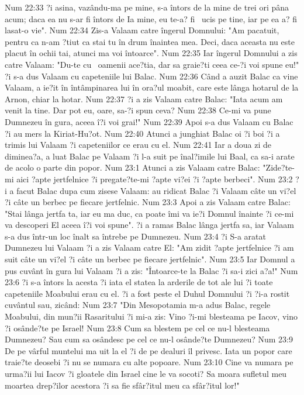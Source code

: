 Num 22:33  ?i asina, vazându-ma pe mine, s-a întors de la mine de trei ori pâna acum; daca ea nu s-ar fi întors de Ia mine, eu te-a? fi  ucis pe tine, iar pe ea a? fi lasat-o vie".
Num 22:34  Zis-a Valaam catre îngerul Domnului: "Am pacatuit, pentru ca n-am ?tiut ca stai tu în drum înaintea mea. Deci, daca aceasta nu este placut în ochii tai, atunci ma voi întoarce".
Num 22:35  Iar îngerul Domnului a zis catre Valaam: "Du-te cu  oamenii ace?tia, dar sa graie?ti ceea ce-?i voi spune eu!" ?i s-a dus Valaam cu capeteniile lui Balac.
Num 22:36  Când a auzit Balac ca vine Valaam, a ie?it în întâmpinarea lui în ora?ul moabit, care este lânga hotarul de la Arnon, chiar la hotar.
Num 22:37  ?i a zis Valaam catre Balac: "Iata acum am venit la tine. Dar pot eu, oare, sa-?i spun ceva?
Num 22:38  Ce-mi va pune Dumnezeu în gura, aceea î?i voi grai!"
Num 22:39  Apoi s-a dus Valaam cu Balac ?i au mers la Kiriat-Hu?ot.
Num 22:40  Atunci a junghiat Balac oi ?i boi ?i a trimis lui Valaam ?i capeteniilor ce erau cu el.
Num 22:41  Iar a doua zi de diminea?a, a luat Balac pe Valaam ?i l-a suit pe înal?imile lui Baal, ca sa-i arate de acolo o parte din popor.
Num 23:1  Atunci a zis Valaam catre Balac: "Zide?te-mi aici ?apte jertfelnice ?i pregate?te-mi ?apte vi?ei ?i ?apte berbeci".
Num 23:2  ?i a facut Balac dupa cum zisese Valaam: au ridicat Balac ?i Valaam câte un vi?el ?i câte un berbec pe fiecare jertfelnic.
Num 23:3  Apoi a zis Valaam catre Balac: "Stai lânga jertfa ta, iar eu ma duc, ca poate îmi va ie?i Domnul înainte ?i ce-mi va descoperi El aceea î?i voi spune". ?i a ramas Balac lânga jertfa sa, iar Valaam s-a dus într-un loc înalt sa întrebe pe Dumnezeu.
Num 23:4  ?i S-a aratat Dumnezeu lui Valaam ?i a zis Valaam catre El: "Am zidit ?apte jertfelnice ?i am suit câte un vi?el ?i câte un berbec pe fiecare jertfelnic".
Num 23:5  Iar Domnul a pus cuvânt în gura lui Valaam ?i a zis: "Întoarce-te la Balac ?i sa-i zici a?a!"
Num 23:6  ?i s-a întors la acesta ?i iata el statea la arderile de tot ale lui ?i toate capeteniile Moabului erau cu el. ?i a fost peste el Duhul Domnului ?i ?i-a rostit cuvântul sau, zicând:
Num 23:7  "Din Mesopotamia m-a adus Balac, regele Moabului, din mun?ii Rasaritului ?i mi-a zis: Vino ?i-mi blesteama pe Iacov, vino ?i osânde?te pe Israel!
Num 23:8  Cum sa blestem pe cel ce nu-l blesteama Dumnezeu? Sau cum sa osândesc pe cel ce nu-l osânde?te Dumnezeu?
Num 23:9  De pe vârful muntelui ma uit la el ?i de pe dealuri îl privesc. Iata un popor care traie?te deosebi ?i nu se numara cu alte popoare.
Num 23:10  Cine va numara pe urma?ii lui Iacov ?i gloatele din Israel cine le va socoti? Sa moara sufletul meu moartea drep?ilor acestora ?i sa fie sfâr?itul meu ca sfâr?itul lor!"

